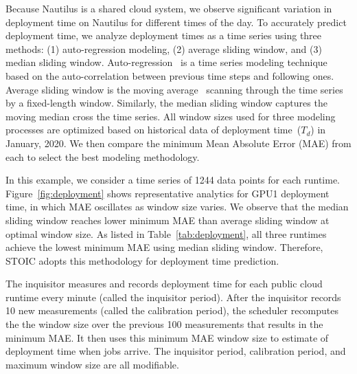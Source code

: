 Because Nautilus is a shared cloud system, we observe significant variation in deployment time on Nautilus for different times of the day. To accurately predict deployment time, we analyze deployment times as a time series using three methods: (1) auto-regression modeling, (2) average sliding window, and (3) median sliding window. Auto-regression~\cite{ref:autoreg} is a time series modeling technique based on the auto-correlation between previous time steps and following ones. Average sliding window is the moving average~\cite{ref:moveavg} scanning through the time series by a fixed-length window. Similarly, the median sliding window captures the moving median cross the time series. All window sizes used for three modeling processes are optimized based on historical data of deployment time~($T_d$) in January, 2020. We then compare the minimum Mean Absolute Error (MAE) from each to select the best modeling methodology. 

In this example, we consider a time series of 1244 data points for each runtime. Figure~\ref{fig:deployment} shows representative analytics for GPU1 deployment time, in which MAE oscillates as window size varies. We observe that the median sliding window reaches lower minimum MAE than average sliding window at optimal window size. As listed in Table~\ref{tab:deployment}, all three runtimes achieve the lowest minimum MAE using median sliding window. Therefore, STOIC adopts this methodology for deployment time prediction. 

The inquisitor measures and records deployment time for each public cloud runtime every minute (called the inquisitor period). After the inquisitor records 10 new measurements (called the calibration period), the scheduler recomputes the the window size over the previous 100 measurements that results in the minimum MAE. It then uses this minimum MAE window size to estimate of deployment time when jobs arrive. The inquisitor period, calibration period, and maximum window size are all modifiable.

 
